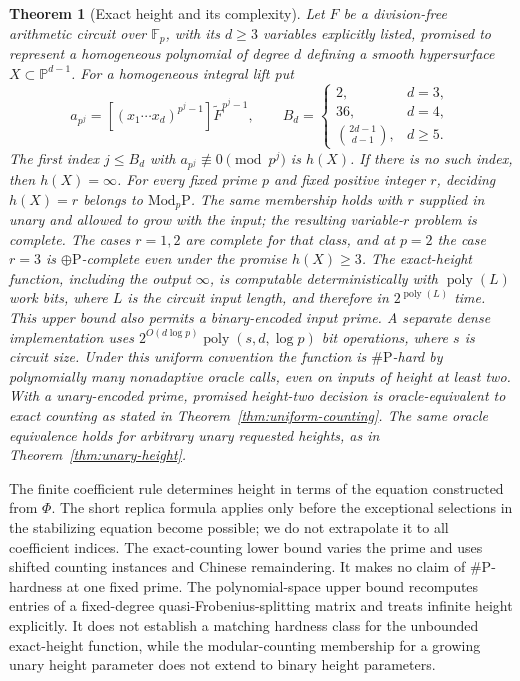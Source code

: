 \documentclass[11pt]{article}
\newtheorem{theorem}{Theorem}[section]
\theoremstyle{definition}
\begin{document}
\begin{theorem}[Exact height and its complexity]\label{thm:intro-complexity}
Let $F$ be a division-free arithmetic circuit over $\mathbb F_p$,
with its $d\ge3$ variables explicitly listed, promised to represent
a homogeneous polynomial of degree $d$ defining a smooth hypersurface
$X\subset\mathbb P^{d-1}$. For a homogeneous integral lift put
\[
 a_{p^j}=[(x_1\cdots x_d)^{p^j-1}]\widetilde F^{p^j-1},\qquad
 B_d=\begin{cases}2,&d=3,\\36,&d=4,\\
 \binom{2d-1}{d-1},&d\ge5.\end{cases}
\]
The first index $j\le B_d$ with $a_{p^j}\not\equiv0\pmod{p^j}$
is $h(X)$. If there is no such index, then $h(X)=\infty$.
For every fixed prime $p$ and fixed positive integer $r$, deciding
$h(X)=r$ belongs to $\mathrm{Mod}_p\mathrm P$.
The same membership holds with $r$ supplied in unary and allowed to
grow with the input; the resulting variable-$r$ problem is complete.
The cases $r=1,2$ are complete for that class, and at $p=2$ the
case $r=3$ is $\oplus\mathrm P$-complete even under the promise
$h(X)\ge3$.
The exact-height function, including the output $\infty$, is
computable deterministically with $\operatorname{poly}(L)$ work bits,
where $L$ is the circuit input length, and therefore in
$2^{\operatorname{poly}(L)}$ time. This upper bound also permits a
binary-encoded input prime. A separate dense implementation uses
$2^{O(d\log p)}\operatorname{poly}(s,d,\log p)$ bit operations,
where $s$ is circuit size. Under this uniform
convention the function is $\#\mathrm P$-hard by polynomially many
nonadaptive oracle calls, even on inputs of height at least two. With
a unary-encoded prime, promised height-two decision is oracle-equivalent
to exact counting as stated in Theorem~\ref{thm:uniform-counting}.
The same oracle equivalence holds for arbitrary unary requested heights,
as in Theorem~\ref{thm:unary-height}.
\end{theorem}

The finite coefficient rule determines height in terms of the equation
constructed from $\Phi$. The short replica formula applies only before
the exceptional selections in the stabilizing equation become possible;
we do not extrapolate it to all coefficient indices.
The exact-counting lower bound varies the prime and uses shifted
counting instances and Chinese remaindering. It makes no claim of
$\#\mathrm P$-hardness at one fixed prime.
The polynomial-space upper bound recomputes entries of a fixed-degree
quasi-Frobenius-splitting matrix and treats infinite height explicitly. It does not establish a matching hardness
class for the unbounded exact-height function, while the modular-counting membership for a growing unary height
parameter does not extend to binary height parameters.
\end{document}
